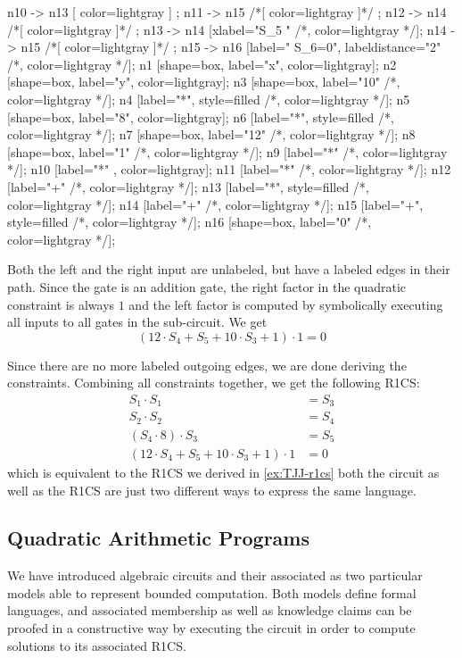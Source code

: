 \begin{example}
\begin{center}
{	n10 -> n13 [ color=lightgray ] ; 
	n11 -> n15 /*[ color=lightgray ]*/ ;
	n12 -> n14 /*[ color=lightgray ]*/ ;	
	n13 -> n14 [xlabel="S_5  "  /*, color=lightgray */];
	n14 -> n15 /*[ color=lightgray ]*/ ;
	n15 -> n16 [label="  S_6=0", labeldistance="2" /*, color=lightgray */];
	n1 [shape=box, label="x", color=lightgray];
	n2 [shape=box, label="y", color=lightgray];
	n3 [shape=box, label="10" /*, color=lightgray */];
	n4 [label="*", style=filled /*, color=lightgray */];
	n5 [shape=box, label="8", color=lightgray];
	n6 [label="*", style=filled /*, color=lightgray */];
	n7 [shape=box, label="12" /*, color=lightgray */];
	n8 [shape=box, label="1" /*, color=lightgray */];
	n9 [label="*" /*, color=lightgray */];
	n10 [label="*" , color=lightgray];
	n11 [label="*" /*, color=lightgray */];	
	n12 [label="+" /*, color=lightgray */];	
	n13 [label="*", style=filled /*, color=lightgray */];
	n14 [label="+" /*, color=lightgray */];
	n15 [label="+", style=filled /*, color=lightgray */];
	n16 [shape=box, label="0" /*, color=lightgray */];		
}
\end{center}
Both the left and the right input are  unlabeled, but have a labeled edges in their path. Since the gate is an addition gate, the right factor in the quadratic constraint is always $1$ and the left factor is computed by symbolically executing all inputs to all gates in the sub-circuit. We get
$$
(12\cdot S_4 + S_5 + 10\cdot S_3 + 1)\cdot 1 = 0
$$

Since there are no more labeled outgoing edges, we are done deriving the constraints. Combining all constraints together, we get the following R1CS:
\begin{align*}
 S_1 \cdot S_1 &= S_3\\
 S_2 \cdot S_2 &= S_4\\
 (S_4\cdot 8)\cdot S_3 &= S_5\\
 (12\cdot S_4 + S_5 + 10\cdot S_3 + 1)\cdot 1 &= 0
\end{align*}
which is equivalent to the R1CS we derived in \examplename{} \ref{ex:TJJ-r1cs} both the circuit as well as the R1CS are just two different ways to express the same language.
\end{example}
\subsection{Quadratic Arithmetic Programs}
\label{sec:QAP}
 We have introduced algebraic circuits and their associated  as two particular models able to represent bounded computation. Both models define formal languages, and associated membership as well as knowledge claims can be proofed in a constructive way by executing the circuit in order to compute solutions to its associated R1CS. 

